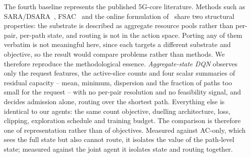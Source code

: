 \documentclass[10pt,journal,comsoc]{IEEEtran}
\begin{document}
The fourth baseline represents the published 5G-core literature. Methods
such as SARA/DSARA~\cite{villota2022admission}, FSAC~\cite{wang2024fsac}
and the online formulation of~\cite{sulaiman2025datadriven} share two
structural properties: the substrate is described as aggregate resource
pools rather than per-pair, per-path state, and routing is not in the
action space. Porting any of them verbatim is not meaningful here, since
each targets a different substrate and objective, so the result would
compare problems rather than methods. We therefore reproduce the
methodological essence. \emph{Aggregate-state DQN} observes only the
request features, the active-slice counts and four scalar summaries of
residual capacity -- mean, minimum, dispersion and the fraction of paths
too small for the request -- with no per-pair resolution and no
feasibility signal, and decides admission alone, routing over the shortest
path. Everything else is identical to our agents: the same count
objective, duelling architecture, loss, clipping, exploration schedule and
training budget. The comparison is therefore one of representation rather
than of objectives. Measured against AC-only, which sees the full state
but also cannot route, it isolates the value of the path-level state;
measured against the joint agent it isolates state and routing together.
\end{document}
